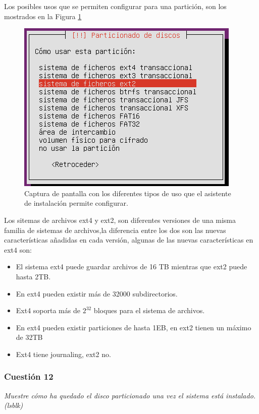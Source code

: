 Los posibles usos que se permiten configurar para una partición, son los mostrados en la Figura \ref{fig2}
\begin{figure}[H]
    \begin{center}
        \includegraphics[scale=0.5]{Imagenes/tipos_usos_particiones}
        \caption{Captura de pantalla con los diferentes tipos de uso que el asistente de instalación permite configurar.}
        \label{fig2}
    \end{center}
\end{figure}

Los sitemas de archivos ext4 y ext2, son diferentes versiones de una misma familia de sistemas de archivos,la diferencia entre los dos son las nuevas características añadidas en cada versión, algunas de las nuevas características en ext4 son:\cite{ext} \cite{ext1}
\begin{itemize}
    \item El sistema ext4 puede guardar archivos de 16 TB mientras que ext2 puede hasta 2TB.
    \item En ext4 pueden existir más de  32000 subdirectorios.
    \item Ext4 soporta más de $ 2^{32} $ bloques para el sistema de archivos.
    \item En ext4 pueden existir particiones de hasta 1EB, en ext2 tienen un máximo de 32TB
    \item Ext4 tiene journaling, ext2 no.
\end{itemize}

\subsubsection{Cuestión 12}
\textit{Muestre cómo ha quedado el disco particionado una vez el sistema está instalado. (lsblk)} \newline

